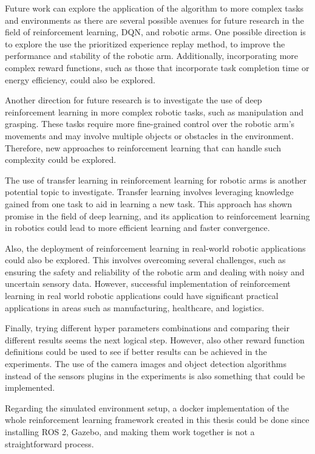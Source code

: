 \documentclass[12pt,oneside]{article}
\begin{document}
Future work can explore the application of the algorithm to more complex tasks and environments as there are several possible avenues for future research in the field of reinforcement learning, DQN, and robotic arms. One possible direction is to explore the use the prioritized experience replay method, to improve the performance and stability of the robotic arm. Additionally, incorporating more complex reward functions, such as those that incorporate task completion time or energy efficiency, could also be explored.

Another direction for future research is to investigate the use of deep reinforcement learning in more complex robotic tasks, such as manipulation and grasping. These tasks require more fine-grained control over the robotic arm's movements and may involve multiple objects or obstacles in the environment. Therefore, new approaches to reinforcement learning that can handle such complexity could be explored.

The use of transfer learning in reinforcement learning for robotic arms is another potential topic to investigate. Transfer learning involves leveraging knowledge gained from one task to aid in learning a new task. This approach has shown promise in the field of deep learning, and its application to reinforcement learning in robotics could lead to more efficient learning and faster convergence.

Also, the deployment of reinforcement learning in real-world robotic applications could also be explored. This involves overcoming several challenges, such as ensuring the safety and reliability of the robotic arm and dealing with noisy and uncertain sensory data. However, successful implementation of reinforcement learning in real world robotic applications could have significant practical applications in areas such as manufacturing, healthcare, and logistics.

Finally, trying different hyper parameters combinations and comparing their different results seems the next logical step. However, also other reward function definitions could be used to see if better results can be achieved in the experiments. The use of the camera images and object detection algorithms instead of the sensors plugins in the experiments is also something that could be implemented.

Regarding the simulated environment setup, a docker implementation of the whole reinforcement learning framework created in this thesis could be done since installing ROS 2, Gazebo, and making them work together is not a straightforward process.
\end{document}

